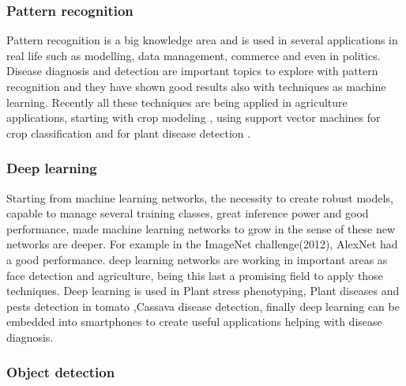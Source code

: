 \subsubsection{Pattern recognition}

Pattern recognition is a big knowledge area and is used in several applications in real life such as modelling, data management, commerce and even in politics. Disease diagnosis and detection are important topics to explore with pattern recognition and they have shown good results\cite{zhang2013nmr,felson1979new} also with techniques as machine learning\cite{kononenko2001machine,sajda2006machine}. Recently all these techniques are being applied in agriculture applications, starting with crop modeling \cite{bannayan2009using} , using support vector machines for crop classification \cite{camps2003support} and for plant disease detection \cite{rumpf2010early}.

\subsubsection{Deep learning}

Starting from machine learning networks, the necessity to create robust models, capable to manage several training classes, great inference power and good performance, made machine learning networks to grow in the sense of these new networks are deeper. For example in the ImageNet challenge(2012), AlexNet had a good performance\cite{NIPS2012_4824}. deep learning networks are working in important areas as face detection and agriculture, being this last a promising field to apply those techniques. Deep learning is used in Plant stress phenotyping\cite{SINGH2018883}, Plant diseases and pests detection in tomato\cite{article} ,Cassava disease detection\cite{ramcharan2017deep}\cite{sladojevic2016neural}, finally deep learning can be embedded into smartphones to create useful applications helping with disease diagnosis\cite{ramcharan}.

\subsubsection{Object detection} 

